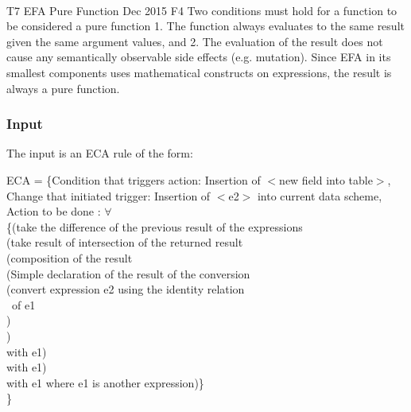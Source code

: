 \documentclass[12pt]{report}
\begin{document}
\paragraph{}
\systemTest
{T7}
{EFA Pure Function}
{Dec 2015}
{F4}
{Two conditions must hold for a function to be considered a pure function 1. 
The function always evaluates to the same result given the same argument 
values, and 2. The evaluation of the result does not cause any semantically 
observable side effects (e.g. mutation). Since EFA in its smallest components 
uses mathematical constructs on expressions, the result is always a pure 
function. }
\vspace{-12pt}\subsubsection*{Input}
The input is an ECA rule of the form:
 \begin{tabbing}
ECA = \{Condition that triggers action: Insertion of $<$new field into 
table$>$, 
\\	 \tabb \tabb Change that initiated trigger: Insertion of $<$e2$>$ into 
	current data scheme, \\
	\tabb \tabb \tabb	Action to be done : $\forall$  \\
		\tabb \tabb \tabb \tabb	\{(take the difference of the previous result 
		of the expressions \\
				\tabb \tabb \tabb \tabb \tabb(take result of intersection of 
				the returned result\\
\tabb \tabb \tabb \tabb \tabb \tabb(composition of the result \\
		\tabb \tabb \tabb \tabb \tabb \tabb \tabb	(Simple declaration of the 
		result 
		of the conversion \\
\tabb \tabb \tabb \tabb \tabb \tabb \tabb \tabb(convert expression e2 using the 
identity relation  
							\\
\tabb \tabb \tabb \tabb \tabb \tabb \tabb \ of e1 \\
\tabb \tabb \tabb \tabb \tabb \tabb \tabb ) \\
\tabb \tabb \tabb \tabb \tabb \tabb )\\
\tabb \tabb \tabb \tabb \tabb  with e1) \\
\tabb \tabb \tabb \tabb	with e1) \\
\tabb \tabb \tabb  with e1 where e1 is another expression)\} \\
	
\tabb \} 
	\end{tabbing}
\end{document}
